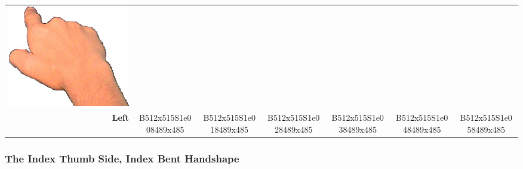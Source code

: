 \documentclass{article}
\begin{document}
\begin{center}
\begin{tabular}{r*{6}{c}}
\includegraphics[scale=0.1]{images/09-04-6.jpg}\\
\textbf{Left}&
B512x515S1e008489x485&
B512x515S1e018489x485&
B512x515S1e028489x485&
B512x515S1e038489x485&
B512x515S1e048489x485&
B512x515S1e058489x485\\
\end{tabular}
\end{center}

\subsubsection{The Index Thumb Side, Index Bent Handshape}
\end{document}
